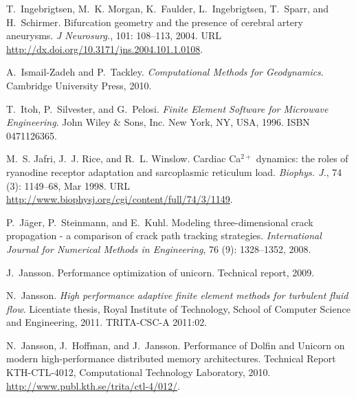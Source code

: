 \begin{thebibliography}{467}
T.~Ingebrigtsen, M.~K. Morgan, K.~Faulder, L.~Ingebrigtsen, T.~Sparr, and
  H.~Schirmer.
\newblock Bifurcation geometry and the presence of cerebral artery aneurysms.
\newblock \emph{J Neurosurg.}, 101: 108--113, 2004.
\newblock URL \url{http://dx.doi.org/10.3171/jns.2004.101.1.0108}.

A.~Ismail-Zadeh and P.~Tackley.
\newblock \emph{Computational Methods for Geodynamics}.
\newblock Cambridge University Press, 2010.

T.~Itoh, P.~Silvester, and G.~Pelosi.
\newblock \emph{Finite Element Software for Microwave Engineering}.
\newblock John Wiley \& Sons, Inc. New York, NY, USA, 1996.
\newblock ISBN 0471126365.

M.~S. Jafri, J.~J. Rice, and R.~L. Winslow.
\newblock Cardiac {C}a$^{2+}$ dynamics: the roles of ryanodine receptor
  adaptation and sarcoplasmic reticulum load.
\newblock \emph{Biophys. J.}, 74 (3): 1149--68, Mar 1998.
\newblock URL \url{http://www.biophysj.org/cgi/content/full/74/3/1149}.

P.~J\"ager, P.~Steinmann, and E.~Kuhl.
\newblock Modeling three-dimensional crack propagation - a comparison of crack
  path tracking strategies.
\newblock \emph{International Journal for Numerical Methods in Engineering},
  76 (9): 1328--1352, 2008.

J.~Jansson.
\newblock Performance optimization of unicorn.
\newblock Technical report, 2009.

N.~Jansson.
\newblock \emph{High performance adaptive finite element methods for turbulent
  fluid flow}.
\newblock Licentiate thesis, Royal Institute of Technology, School of Computer
  Science and Engineering, 2011.
\newblock TRITA-CSC-A 2011:02.

N.~Jansson, J.~Hoffman, and J.~Jansson.
\newblock Performance of {D}olfin and {U}nicorn on modern high-performance
  distributed memory architectures.
\newblock Technical Report KTH-CTL-4012, Computational Technology Laboratory,
  2010.
\newblock \url{http://www.publ.kth.se/trita/ctl-4/012/}.


\end{thebibliography}
